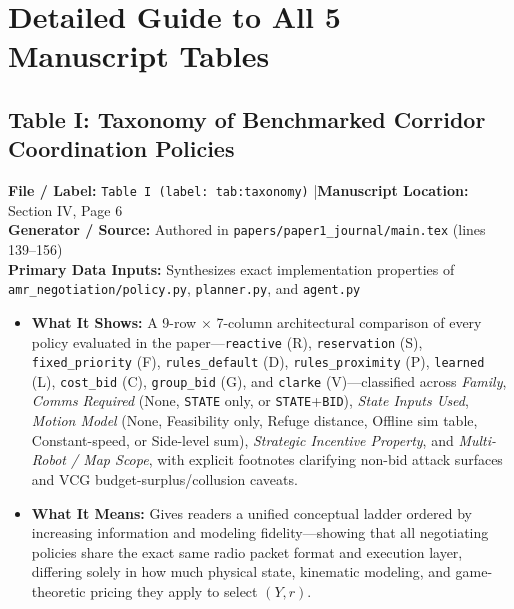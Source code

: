 \documentclass[10pt,a4paper]{article}
\newcommand{\meta}[4]{%
  \vspace{2pt}%
  \noindent\colorbox{BoxBg}{%
    \parbox{\dimexpr\textwidth-2\fboxsep\relax}{%
      \footnotesize\raggedright
      \textbf{File / Label:} \texttt{#1} \quad|\quad \textbf{Manuscript Location:} #2\\[1pt]
      \textbf{Generator / Source:} #3\\[1pt]
      \textbf{Primary Data Inputs:} #4%
    }%
  }\par\vspace{4pt}%
}
\begin{document}
\begin{itemize}
\begin{itemize}
  \end{itemize}
\end{itemize}

\clearpage
\section{Detailed Guide to All 5 Manuscript Tables}

\subsection{Table I: Taxonomy of Benchmarked Corridor Coordination Policies}

\meta{Table I (label: tab:taxonomy)}{Section IV, Page 6}{Authored in \texttt{papers/paper1\_journal/main.tex} (lines 139--156)}{Synthesizes exact implementation properties of \texttt{amr\_negotiation/policy.py}, \texttt{planner.py}, and \texttt{agent.py}}

\begin{itemize}
  \item \textbf{What It Shows:} A 9-row $\times$ 7-column architectural comparison of every policy evaluated in the paper---\texttt{reactive} (R), \texttt{reservation} (S), \texttt{fixed\_priority} (F), \texttt{rules\_default} (D), \texttt{rules\_proximity} (P), \texttt{learned} (L), \texttt{cost\_bid} (C), \texttt{group\_bid} (G), and \texttt{clarke} (V)---classified across \emph{Family}, \emph{Comms Required} (None, \texttt{STATE} only, or \texttt{STATE}+\texttt{BID}), \emph{State Inputs Used}, \emph{Motion Model} (None, Feasibility only, Refuge distance, Offline sim table, Constant-speed, or Side-level sum), \emph{Strategic Incentive Property}, and \emph{Multi-Robot / Map Scope}, with explicit footnotes clarifying non-bid attack surfaces and VCG budget-surplus/collusion caveats.
  \item \textbf{What It Means:} Gives readers a unified conceptual ladder ordered by increasing information and modeling fidelity---showing that all negotiating policies share the exact same radio packet format and execution layer, differing solely in how much physical state, kinematic modeling, and game-theoretic pricing they apply to select $(Y, r)$.
\end{itemize}
\end{document}
